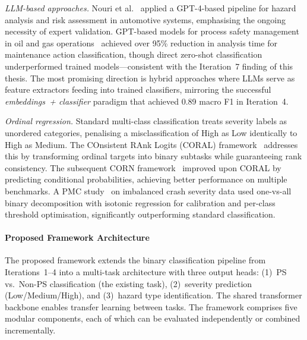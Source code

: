 \documentclass[11pt, titlepage, bibliography=totoc]{scrreprt}
\begin{document}
\textit{LLM-based approaches.}
Nouri et al.~\cite{Nouri2024} applied a GPT-4-based pipeline for hazard analysis and risk assessment in automotive systems, emphasising the ongoing necessity of expert validation. GPT-based models for process safety management in oil and gas operations~\cite{SPE2024} achieved over 95\% reduction in analysis time for maintenance action classification, though direct zero-shot classification underperformed trained models---consistent with the Iteration~7 finding of this thesis. The most promising direction is hybrid approaches where LLMs serve as feature extractors feeding into trained classifiers, mirroring the successful \textit{embeddings~+ classifier} paradigm that achieved 0.89 macro F1 in Iteration~4.

\textit{Ordinal regression.}
Standard multi-class classification treats severity labels as unordered categories, penalising a misclassification of High as Low identically to High as Medium. The COnsistent RAnk Logits (CORAL) framework~\cite{Cao2020} addresses this by transforming ordinal targets into binary subtasks while guaranteeing rank consistency. The subsequent CORN framework~\cite{Shi2023} improved upon CORAL by predicting conditional probabilities, achieving better performance on multiple benchmarks. A PMC study~\cite{PMC2021} on imbalanced crash severity data used one-vs-all binary decomposition with isotonic regression for calibration and per-class threshold optimisation, significantly outperforming standard classification.

\paragraph{Proposed Framework Architecture}
The proposed framework extends the binary classification pipeline from Iterations~1--4 into a multi-task architecture with three output heads: (1)~PS vs.\ Non-PS classification (the existing task), (2)~severity prediction (Low/Medium/High), and (3)~hazard type identification. The shared transformer backbone enables transfer learning between tasks. The framework comprises five modular components, each of which can be evaluated independently or combined incrementally.
\end{document}
